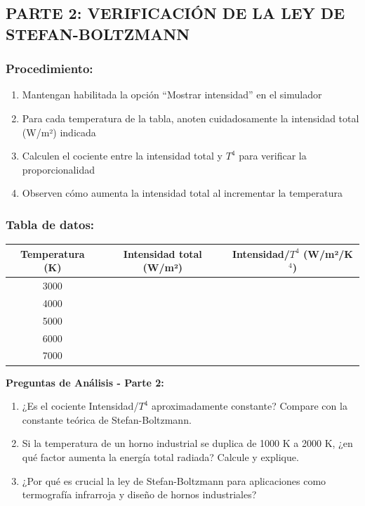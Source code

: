 \documentclass[12pt,a4paper]{article}
\begin{document}
	\subsection{PARTE 2: VERIFICACIÓN DE LA LEY DE STEFAN-BOLTZMANN}
	
	\subsubsection{Procedimiento:}
	\begin{enumerate}
		\item Mantengan habilitada la opción ``Mostrar intensidad'' en el simulador
		\item Para cada temperatura de la tabla, anoten cuidadosamente la intensidad total (W/m²) indicada
		\item Calculen el cociente entre la intensidad total y $T^4$ para verificar la proporcionalidad
		\item Observen cómo aumenta la intensidad total al incrementar la temperatura
	\end{enumerate}
	
	\subsubsection{Tabla de datos:}
	
	\begin{center}
		\begin{tabular}{|c|c|c|}
			\hline
			\textbf{Temperatura (K)} & \textbf{Intensidad total (W/m²)} & \textbf{Intensidad/$T^4$ (W/m²/K$^4$)} \\
			\hline
			3000 & & \\
			\hline
			4000 & & \\
			\hline
			5000 & & \\
			\hline
			6000 & & \\
			\hline
			7000 & & \\
			\hline
		\end{tabular}
	\end{center}
	
	\begin{preguntabox}
		\textbf{Preguntas de Análisis - Parte 2:}
		\begin{enumerate}
			\item ¿Es el cociente Intensidad/$T^4$ aproximadamente constante? Compare con la constante teórica de Stefan-Boltzmann.
			
			\vspace{1.5cm}
			
			\item Si la temperatura de un horno industrial se duplica de 1000 K a 2000 K, ¿en qué factor aumenta la energía total radiada? Calcule y explique.
			
			\vspace{1.5cm}
			
			\item ¿Por qué es crucial la ley de Stefan-Boltzmann para aplicaciones como termografía infrarroja y diseño de hornos industriales?
			
			\vspace{1.5cm}
		\end{enumerate}
	\end{preguntabox}
	
\end{document}

